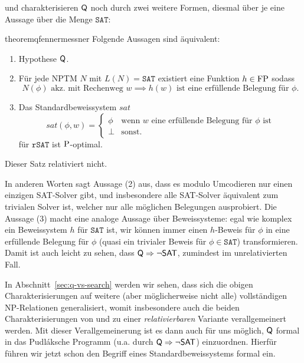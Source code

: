 \textcite{fenner_inverting_2003} und \textcite{messner_simulation_2001} charakterisieren $\hQ$ noch durch zwei weitere Formen, diesmal über je eine Aussage über die Menge $\mathtt{SAT}$:

\begin{restatable}{theorem}{qfennermessner}\label{thm:q-fenner-messner}
    Folgende Aussagen sind äquivalent:
\begin{enumerate}[midpenalty=0,endpenalty=10000]
        \item Hypothese $\hQ$.
        \item \parencite{fenner_inverting_2003} Für jede NPTM $N$ mit $L(N)=\mathtt{SAT}$ existiert eine Funktion $h\in \FP$ sodass 
\[ N(\phi) \text{ akz. mit Rechenweg $w$} \implies \text{$h(w)$ ist eine erfüllende Belegung für $\phi$.} \]
        \item \parencite{messner_simulation_2001} Das Standardbeweissystem $\mathit{sat}$
            \[ \mathit{sat}(\phi, w) = \begin{cases} \phi & \text{wenn $w$ eine erfüllende Belegung für $\phi$ ist} \\ \bot & \text{sonst.} \end{cases}\]
            für $\mathtt{rSAT}$ ist $\P$-optimal.
    \end{enumerate}
    Dieser Satz relativiert nicht.
\end{restatable}

In anderen Worten sagt Aussage (2) aus, dass es modulo Umcodieren nur einen einzigen SAT-Solver gibt, und insbesondere alle SAT-Solver äquivalent zum trivialen Solver ist, welcher nur alle möglichen Belegungen ausprobiert.
Die Aussage (3) macht eine analoge Aussage über Beweissysteme: egal wie komplex ein Beweissystem $h$ für $\mathtt{SAT}$ ist, wir können immer einen $h$-Beweis für $\phi$ in eine erfüllende Belegung für $\phi$ (quasi ein trivialer Beweis für $\phi\in\mathtt{SAT}$) transformieren. Damit ist auch leicht zu sehen, dass $\hQ\Rightarrow \neg\hSAT$, zumindest im unrelativierten Fall.

In Abschnitt~\ref{sec:q-vs-search} werden wir sehen, dass sich die obigen Charakterisierungen auf weitere (aber möglicherweise nicht alle) vollständigen NP-Relationen generalisiert, womit insbesondere auch die beiden Charakterisierungen von \citeauthor{fenner_inverting_2003} und \citeauthor{messner_simulation_2001} zu einer \emph{relativierbaren} Variante verallgemeinert werden.
Mit dieser Verallgemeinerung ist es dann auch für uns möglich, $\hQ$ formal in das Pudláksche Programm (u.a. durch $\hQ\Rightarrow \neg\hSAT$) einzuordnen. Hierfür führen wir jetzt schon den Begriff eines Standardbeweissystems formal ein.

